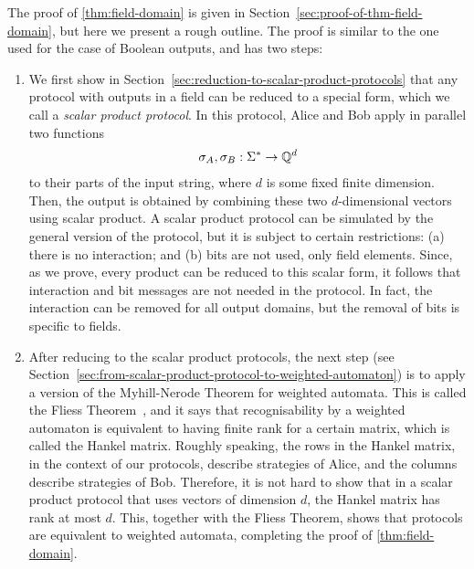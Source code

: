   The proof of \cref{thm:field-domain} is given in Section~\ref{sec:proof-of-thm-field-domain}, but here we present a rough outline.  The proof is similar  to the one used for the case of Boolean outputs, and has  two steps:

\begin{enumerate}
    \item We first show in Section~\ref{sec:reduction-to-scalar-product-protocols} that any protocol with outputs in a field can be reduced to a special  form, which we call a \emph{scalar product protocol}. In this protocol, Alice and Bob apply in parallel two functions 
\begin{align*}
\sigma_A, \sigma_B : \Sigma^* \to {\mathbb Q}^d
\end{align*}
to their parts of the input string, where $d$ is some fixed finite dimension. Then, the output is obtained by combining these two  $d$-dimensional vectors using scalar product. A scalar product protocol can be simulated by the general version of the protocol, but it is subject to certain restrictions: (a) there is no interaction; and (b) bits are not used, only  field elements. Since, as we prove, every product can be reduced to this scalar form, it follows that interaction and bit messages are not needed in the protocol. In fact, the interaction can be removed for all output domains, but the removal of bits is specific to fields. 
\item After reducing to the scalar product protocols, the next step (see Section~\ref{sec:from-scalar-product-protocol-to-weighted-automaton}) is to apply a version of the Myhill-Nerode Theorem for weighted automata. This is called the  Fliess Theorem~\cite{fliess1974}, and it says that recognisability by a weighted automaton is equivalent to having finite rank for a certain matrix, which is called the Hankel matrix. Roughly speaking, the rows in the Hankel matrix, in the context of our protocols, describe strategies of Alice, and the columns describe strategies of Bob. Therefore, it is not hard to show that in a scalar product protocol that uses vectors of dimension $d$,  the Hankel matrix has rank at most $d$. This, together with the Fliess Theorem, shows that protocols are equivalent to weighted automata, completing the proof of \cref{thm:field-domain}.
\end{enumerate}

 




